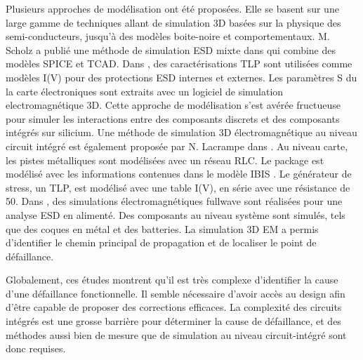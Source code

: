 Plusieurs approches de modélisation ont été proposées.
Elle se basent sur une large gamme de techniques allant de simulation 3D basées sur la physique des semi-conducteurs, jusqu'à des modèles boite-noire et comportementaux.
M. Scholz a publié une méthode de simulation ESD mixte dans \cite{mixedModeESDSims} qui combine des modèles SPICE et TCAD.
Dans \cite{usb2ESDProtection}, des caractérisations TLP sont utilisées comme modèles I(V) pour des protections ESD internes et externes.
Les paramètres S du la carte électroniques sont extraits avec un logiciel de simulation electromagnétique 3D.
Cette approche de modélisation s'est avérée fructueuse pour simuler les interactions entre des composants discrets et des composants intégrés sur silicium.
Une méthode de simulation 3D électromagnétique au niveau circuit intégré est également proposée par N. Lacrampe dans \cite{LacrampeTransientImmunity}.
Au niveau carte, les pistes métalliques sont modélisées avec un réseau RLC.
Le package est modélisé avec les informations contenues dans le modèle IBIS \cite{ibis-spec}.
Le générateur de stress, un TLP, est modélisé avec une table I(V), en série avec une résistance de 50\textOmega{}.
Dans \cite{softFailMobile}, des simulations électromagnétiques fullwave sont réalisées pour une analyse ESD en alimenté.
Des composants au niveau système sont simulés, tels que des coques en métal et des batteries.
La simulation 3D EM a permis d'identifier le chemin principal de propagation et de localiser le point de défaillance.

Globalement, ces études montrent qu'il est très complexe d'identifier la cause d'une défaillance fonctionnelle.
Il semble nécessaire d'avoir accès au design afin d'être capable de proposer des corrections efficaces.
La complexité des circuits intégrés est une grosse barrière pour déterminer la cause de défaillance, et des méthodes aussi bien de mesure que de simulation au niveau circuit-intégré sont donc requises.
